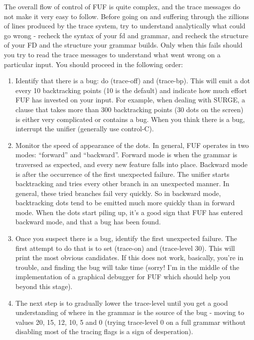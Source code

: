 \documentclass[10pt,a4paper]{report}
\begin{document}
The overall flow of control of FUF is quite complex, and the trace messages
do not make it very easy to follow.  Before going on and suffering
through the zillions of lines produced by the trace system, try to
understand analytically what could go wrong - recheck the syntax of
your fd and grammar, and recheck the structure of your FD and the structure
your grammar builds.  Only when this fails should you try to read the trace
messages to understand what went wrong on a particular input.  You should
proceed in the following order:
\begin{enumerate}
\item Identify that there is a bug: do (trace-off) and (trace-bp).  This will
emit a dot every 10 backtracking points (10 is the default) and indicate
how much effort FUF has invested on your input.  For example, when dealing
with SURGE, a clause that takes more than 300 backtracking points (30 dots
on the screen) is either very complicated or contains a bug.  When you
think there is a bug, interrupt the unifier (generally use control-C).

\item Monitor the speed of appearance of the dots.  In general, FUF operates in
two modes: ``forward'' and ``backward''.  Forward mode is when the grammar
is traversed as expected, and every new feature falls into place.  Backward
mode is after the occurrence of the first unexpected failure.  The unifier
starts backtracking and tries every other branch in an unexpected manner.
In general, these tried branches fail very quickly.  So in backward mode,
backtracking dots tend to be emitted much more quickly than in forward
mode.  When the dots start piling up, it's a good sign that FUF has entered
backward mode, and that a bug has been found.

\item Once you suspect there is a bug, identify the first unexpected failure.
The first attempt to do that is to set (trace-on) and (trace-level 30).
This will print the most obvious candidates.  If this does not work,
basically, you're in trouble, and finding the bug will take time (sorry!
I'm in the middle of the implementation of a graphical debugger for FUF
which should help you beyond this stage).

\item The next step is to gradually lower the trace-level until you get a good
understanding of where in the grammar is the source of the bug - moving to
values 20, 15, 12, 10, 5 and 0 (trying trace-level 0 on a full grammar
without disabling most of the tracing flags is a sign of desperation).


\end{enumerate}
\end{document}
